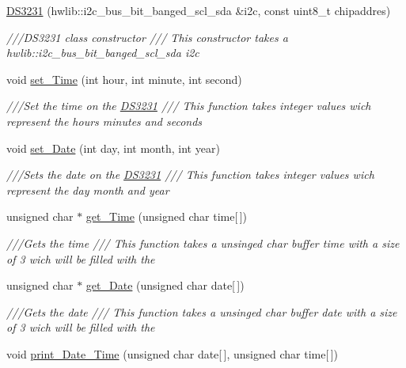 \begin{DoxyCompactItemize}
\item 
\hyperlink{classDS3231_ae604eb753bffe5a7752c0c6131c199c0}{D\+S3231} (hwlib\+::i2c\+\_\+bus\+\_\+bit\+\_\+banged\+\_\+scl\+\_\+sda \&i2c, const uint8\+\_\+t chipaddres)
\begin{DoxyCompactList}\small\item\em ///\+D\+S3231 class constructor  /// This constructor takes a hwlib\+::i2c\+\_\+bus\+\_\+bit\+\_\+banged\+\_\+scl\+\_\+sda i2c \end{DoxyCompactList}\item 
void \hyperlink{classDS3231_aee414e3f1856b9495a79e659b92231c1}{set\+\_\+\+Time} (int hour, int minute, int second)
\begin{DoxyCompactList}\small\item\em ///\+Set the time on the \hyperlink{classDS3231}{D\+S3231}  /// This function takes integer values wich represent the hours minutes and seconds \end{DoxyCompactList}\item 
void \hyperlink{classDS3231_a9c7b9495c68607c0666006f318e9afca}{set\+\_\+\+Date} (int day, int month, int year)
\begin{DoxyCompactList}\small\item\em ///\+Sets the date on the \hyperlink{classDS3231}{D\+S3231}  /// This function takes integer values wich represent the day month and year \end{DoxyCompactList}\item 
unsigned char $\ast$ \hyperlink{classDS3231_a2fd39852689c72e04cc2ad67371976c1}{get\+\_\+\+Time} (unsigned char time\mbox{[}$\,$\mbox{]})
\begin{DoxyCompactList}\small\item\em ///\+Gets the time  /// This function takes a unsinged char buffer time with a size of 3 wich will be filled with the \end{DoxyCompactList}\item 
unsigned char $\ast$ \hyperlink{classDS3231_a3f239b6d1a7caea0d5968e96d4d01c33}{get\+\_\+\+Date} (unsigned char date\mbox{[}$\,$\mbox{]})
\begin{DoxyCompactList}\small\item\em ///\+Gets the date  /// This function takes a unsinged char buffer date with a size of 3 wich will be filled with the \end{DoxyCompactList}\item 
void \hyperlink{classDS3231_aeab337c5de40bcebaf6aa3e856d43e69}{print\+\_\+\+Date\+\_\+\+Time} (unsigned char date\mbox{[}$\,$\mbox{]}, unsigned char time\mbox{[}$\,$\mbox{]})

\end{DoxyCompactItemize}
